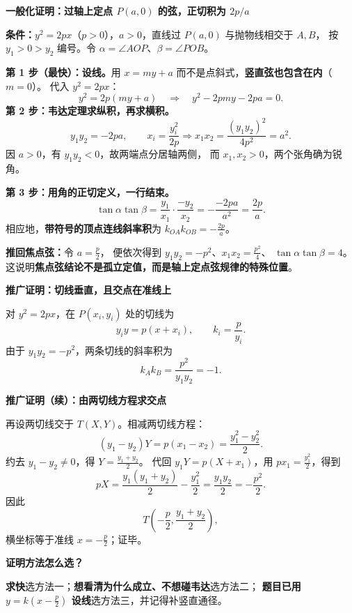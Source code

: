 \begin{proofbox}
\textbf{\textcolor{CProof}{一般化证明：过轴上定点 $P(a,0)$ 的弦，正切积为 $2p/a$}}
\begin{center}\end{center}

\textbf{条件：}$y^2=2px$（$p>0$），$a>0$，直线过 $P(a,0)$ 与抛物线相交于 $A,B$，
按 $y_1>0>y_2$ 编号。令 $\alpha=\angle AOP$、$\beta=\angle POB$。

\textbf{第 1 步（最快）：设线。}用 $x=my+a$ 而不是点斜式，\textbf{竖直弦也包含在内}（$m=0$）。
代入 $y^2=2px$：
\[
 y^2=2p(my+a)\quad\Longrightarrow\quad
 y^2-2pmy-2pa=0.
\]
\textbf{第 2 步：韦达定理求纵积，再求横积。}
\[
 \boxed{y_1y_2=-2pa},\qquad
 x_i=\frac{y_i^2}{2p}
 \Longrightarrow
 \boxed{x_1x_2=\frac{(y_1y_2)^2}{4p^2}=a^2}.
\]
因 $a>0$，有 $y_1y_2<0$，故两端点分居轴两侧，
而 $x_1,x_2>0$，两个张角确为锐角。

\textbf{第 3 步：用角的正切定义，一行结束。}
\[
 \boxed{\tan\alpha\tan\beta
 =\frac{y_1}{x_1}\cdot\frac{-y_2}{x_2}
 =-\frac{-2pa}{a^2}=\frac{2p}{a}}.
\]
相应地，\textbf{带符号的顶点连线斜率积}为
$\boxed{k_{OA}k_{OB}=-\frac{2p}{a}}$。

\textbf{推回焦点弦：}令 $a=\frac p2$，
便依次得到 $y_1y_2=-p^2$、$x_1x_2=\frac{p^2}{4}$、
$\tan\alpha\tan\beta=4$。
这说明\textbf{焦点弦结论不是孤立定值，而是轴上定点弦规律的特殊位置}。
\end{proofbox}
\clearpage
\begin{proofbox}
\textbf{\textcolor{CProof}{推广证明：切线垂直，且交点在准线上}}\par\smallskip
\begin{center}\end{center}
对 $y^2=2px$，在 $P(x_i,y_i)$ 处的切线为
\[
 y_iy=p(x+x_i),\qquad k_i=\frac p{y_i}.
\]
由于 $y_1y_2=-p^2$，两条切线的斜率积为
\[
 \boxed{k_Ak_B=\frac{p^2}{y_1y_2}=-1}.
\]
\end{proofbox}
\clearpage
\begin{proofbox}
\textbf{\textcolor{CProof}{推广证明（续）：由两切线方程求交点}}\par\smallskip
再设两切线交于 $T(X,Y)$。相减两切线方程：
\[
 (y_1-y_2)Y=p(x_1-x_2)
 =\frac{y_1^2-y_2^2}{2}.
\]
约去 $y_1-y_2\ne0$，得 $Y=\frac{y_1+y_2}{2}$。
代回 $y_1Y=p(X+x_1)$，用 $px_1=\frac{y_1^2}{2}$，得到
\[
 pX=\frac{y_1(y_1+y_2)}{2}-\frac{y_1^2}{2}
 =\frac{y_1y_2}{2}=-\frac{p^2}{2}.
\]
因此
\[
 \boxed{T\!\left(-\frac p2,\frac{y_1+y_2}{2}\right)},
\]
横坐标等于准线 $x=-\frac p2$；证毕。

\medskip
\textbf{\textcolor{CProof}{证明方法怎么选？}}\par\smallskip
\textbf{求快}选方法一；\textbf{想看清为什么成立、不想碰韦达}选方法二；
\textbf{题目已用 $y=k(x-\frac p2)$ 设线}选方法三，并记得补竖直通径。
\end{proofbox}
